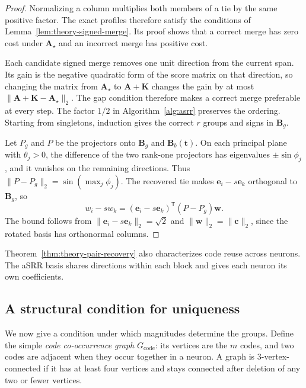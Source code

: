 \begin{proof}
    Normalizing a column multiplies both members of a tie by the same
    positive factor. The exact profiles therefore satisfy the conditions
    of Lemma~\ref{lem:theory-signed-merge}. Its proof shows that a correct
    merge has zero cost under $\mathbf A_\star$ and an incorrect merge
    has positive cost.

    Each candidate signed merge removes one unit direction from the
    current span. Its gain is the negative quadratic form of the score
    matrix on that direction, so changing the matrix from
    $\mathbf A_\star$ to $\mathbf A+\mathbf K$ changes the gain by at most
    $\lVert\mathbf A+\mathbf K-\mathbf A_\star\rVert_2$. The gap condition
    therefore makes a correct merge preferable at every step. The
    factor $1/2$ in Algorithm~\ref{alg:asrr} preserves the ordering.
    Starting from singletons, induction gives the correct $r$ groups and
    signs in $\mathbf B_g$.

    Let $P_g$ and $P$ be the projectors onto $\mathbf B_g$ and
    $\mathbf B_b(\mathbf t)$. On each principal plane with $\theta_j>0$,
    the difference of the two rank-one projectors has eigenvalues
    $\pm\sin\phi_j$, and it vanishes on the remaining directions. Thus
    $\lVert P-P_g\rVert_2=\sin(\max_j\phi_j)$. The recovered tie makes
    $\mathbf e_i-s\mathbf e_k$ orthogonal to $\mathbf B_g$, so
    \[
        w_i-s w_k=(\mathbf e_i-s\mathbf e_k)^{\mathsf T}(P-P_g)\mathbf w.
    \]
    The bound follows from $\lVert\mathbf e_i-s\mathbf e_k\rVert_2=\sqrt{2}$
    and $\lVert\mathbf w\rVert_2=\lVert\mathbf c\rVert_2$, since the
    rotated basis has orthonormal columns.
\end{proof}

Theorem~\ref{thm:theory-pair-recovery} also characterizes code reuse
across neurons. The aSRR basis shares directions within each block
and gives each neuron its own coefficients.

\subsection{A structural condition for uniqueness}
\label{sec:theory-graph}

We now give a condition under which magnitudes determine the groups.
Define the simple \emph{code co-occurrence graph} $G_{\mathrm{code}}$:
its vertices are the $m$ codes, and two codes are adjacent when
they occur together in a neuron. A graph is 3-vertex-connected
if it has at least four vertices and stays connected after deletion
of any two or fewer vertices.

